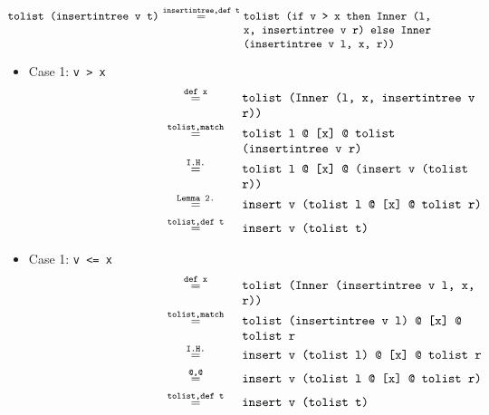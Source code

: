 \begin{itemize}
{        \begin{displaymath}
            \begin{aligned}
                \texttt{tolist (insertintree v t)}
                &\eq{insertintree,def t}{tolist (if v > x then Inner (l, x, insertintree v r) else Inner (insertintree v l, x, r))} \\
            \end{aligned}
        \end{displaymath}
        \begin{itemize}
            \item {
                Case 1: \texttt{v > x}
                \begin{displaymath}
                    \begin{aligned}
                        \phantom{\texttt{tolist (insertintr}}
                        &\eq{def x}{tolist (Inner (l, x, insertintree v r))} \\
                        &\eq{tolist,match}{tolist l @ [x] @ tolist (insertintree v r)} \\
                        &\eq{I.H.}{tolist l @ [x] @ (insert v (tolist r))} \\
                        &\eq{Lemma 2.}{insert v (tolist l @ [x] @ tolist r)} \\
                        &\eq{tolist,def t}{insert v (tolist t)}
                    \end{aligned}
                \end{displaymath}
            }
            \item {
                Case 1: \texttt{v <= x}
                \begin{displaymath}
                    \begin{aligned}
                        \phantom{\texttt{tolist (insertintr}}
                        &\eq{def x}{tolist (Inner (insertintree v l, x, r))} \\
                        &\eq{tolist,match}{tolist (insertintree v l) @ [x] @ tolist r} \\
                        &\eq{I.H.}{insert v (tolist l) @ [x] @ tolist r} \\
                        &\eq{@,@}{insert v (tolist l @ [x] @ tolist r)} \\
                        &\eq{tolist,def t}{insert v (tolist t)}
                    \end{aligned}
                \end{displaymath}
            }
        \end{itemize}

}
\end{itemize}
